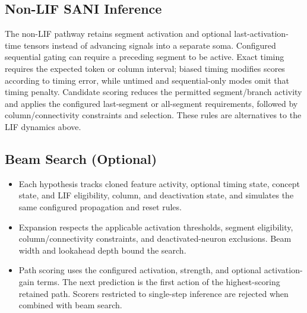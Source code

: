 \subsection{Non-LIF SANI Inference}
The non-LIF pathway retains segment activation and optional last-activation-time tensors instead of advancing signals into a separate soma. Configured sequential gating can require a preceding segment to be active. Exact timing requires the expected token or column interval; biased timing modifies scores according to timing error, while untimed and sequential-only modes omit that timing penalty. Candidate scoring reduces the permitted segment/branch activity and applies the configured last-segment or all-segment requirements, followed by column/connectivity constraints and selection. These rules are alternatives to the LIF dynamics above.

\subsection{Beam Search (Optional)}
\begin{itemize}
	\item Each hypothesis tracks cloned feature activity, optional timing state, concept state, and LIF eligibility, column, and deactivation state, and simulates the same configured propagation and reset rules.
	\item Expansion respects the applicable activation thresholds, segment eligibility, column/connectivity constraints, and deactivated-neuron exclusions. Beam width and lookahead depth bound the search.
	\item Path scoring uses the configured activation, strength, and optional activation-gain terms. The next prediction is the first action of the highest-scoring retained path. Scorers restricted to single-step inference are rejected when combined with beam search.
\end{itemize}

